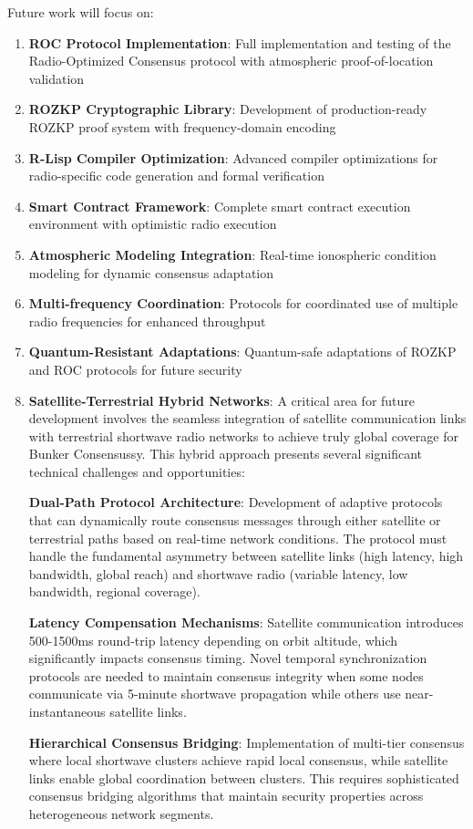 \documentclass[11pt,a4paper]{article}
\begin{document}
Future work will focus on:
\begin{enumerate}
\item \textbf{ROC Protocol Implementation}: Full implementation and testing of the Radio-Optimized Consensus protocol with atmospheric proof-of-location validation
\item \textbf{ROZKP Cryptographic Library}: Development of production-ready ROZKP proof system with frequency-domain encoding
\item \textbf{R-Lisp Compiler Optimization}: Advanced compiler optimizations for radio-specific code generation and formal verification
\item \textbf{Smart Contract Framework}: Complete smart contract execution environment with optimistic radio execution
\item \textbf{Atmospheric Modeling Integration}: Real-time ionospheric condition modeling for dynamic consensus adaptation
\item \textbf{Multi-frequency Coordination}: Protocols for coordinated use of multiple radio frequencies for enhanced throughput
\item \textbf{Quantum-Resistant Adaptations}: Quantum-safe adaptations of ROZKP and ROC protocols for future security
\item \textbf{Satellite-Terrestrial Hybrid Networks}: A critical area for future development involves the seamless integration of satellite communication links with terrestrial shortwave radio networks to achieve truly global coverage for Bunker Consensussy. This hybrid approach presents several significant technical challenges and opportunities:

\textbf{Dual-Path Protocol Architecture}: Development of adaptive protocols that can dynamically route consensus messages through either satellite or terrestrial paths based on real-time network conditions. The protocol must handle the fundamental asymmetry between satellite links (high latency, high bandwidth, global reach) and shortwave radio (variable latency, low bandwidth, regional coverage).

\textbf{Latency Compensation Mechanisms}: Satellite communication introduces 500-1500ms round-trip latency depending on orbit altitude, which significantly impacts consensus timing. Novel temporal synchronization protocols are needed to maintain consensus integrity when some nodes communicate via 5-minute shortwave propagation while others use near-instantaneous satellite links.

\textbf{Hierarchical Consensus Bridging}: Implementation of multi-tier consensus where local shortwave clusters achieve rapid local consensus, while satellite links enable global coordination between clusters. This requires sophisticated consensus bridging algorithms that maintain security properties across heterogeneous network segments.


\end{enumerate}
\end{document}
